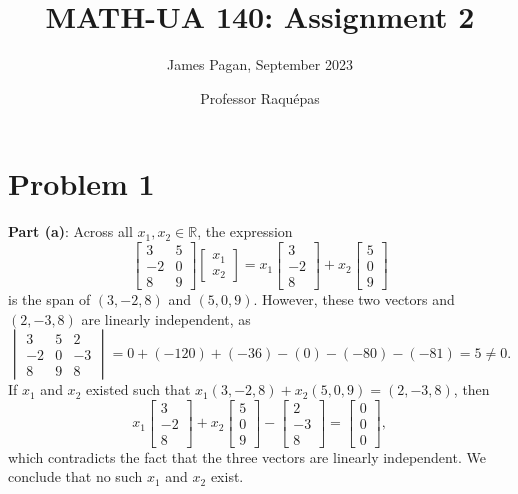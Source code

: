 \documentclass[11pt]{article}
\title{MATH-UA 140: Assignment 2}
\author{James Pagan, September 2023}
\date{Professor Raquépas}
\begin{document}
\maketitle
\tableofcontents


\section{Problem 1}

\textbf{Part (a)}: Across all $x_{1}, x_{2} \in \mathbb{R}$, the expression
\[
	\begin{bmatrix} 3 & 5 \\ -2 & 0 \\ 8 & 9 \end{bmatrix} \begin{bmatrix} x_{1} \\ x_{2} \end{bmatrix} = x_{1} \begin{bmatrix} 3 \\ -2 \\ 8 \end{bmatrix} + x_{2} \begin{bmatrix} 5 \\ 0 \\ 9 \end{bmatrix}
\]
is the span of $(3, -2, 8)$ and $(5, 0, 9)$. However, these two vectors and $(2, -3, 8)$ are linearly independent, as
\[
	\begin{vmatrix} 3 & 5 & 2 \\ -2 & 0 & -3 \\ 8 & 9 & 8 \end{vmatrix} = 0 + (-120) + (-36) - (0) - (-80) - (-81) = 5 \ne 0.
\]
If $x_{1}$ and $x_{2}$ existed such that $x_{1} (3, -2, 8) + x_{2} (5, 0, 9) = (2, -3, 8)$, then
\[
	x_{1} \begin{bmatrix} 3 \\ -2 \\ 8 \end{bmatrix} + x_{2} \begin{bmatrix} 5 \\ 0 \\ 9 \end{bmatrix} - \begin{bmatrix} 2 \\ -3 \\ 8 \end{bmatrix} = \begin{bmatrix} 0 \\ 0 \\ 0 \end{bmatrix},
\]
which contradicts the fact that the three vectors are linearly independent. We conclude that no such $x_{1}$ and $x_{2}$ exist.
\end{document}
